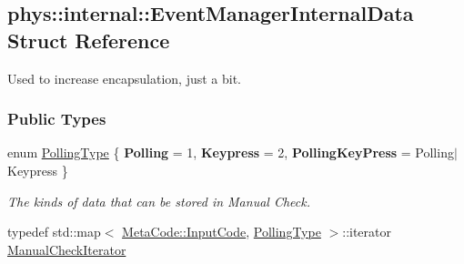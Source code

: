 \hypertarget{structphys_1_1internal_1_1EventManagerInternalData}{
\subsection{phys::internal::EventManagerInternalData Struct Reference}
\label{d6/d3a/structphys_1_1internal_1_1EventManagerInternalData}
}


Used to increase encapsulation, just a bit.  


\subsubsection*{Public Types}
\begin{DoxyCompactItemize}
\item 
enum \hyperlink{structphys_1_1internal_1_1EventManagerInternalData_ab9ab8380b84448aacf46a63050e159af}{PollingType} \{ {\bfseries Polling} = 1, 
{\bfseries Keypress} = 2, 
{\bfseries PollingKeyPress} =  Polling$|$Keypress
 \}
\begin{DoxyCompactList}\small\item\em The kinds of data that can be stored in Manual Check. \item\end{DoxyCompactList}\item 
typedef std::map$<$ \hyperlink{classphys_1_1MetaCode_a3e501cbb5bf0f6f1fdb7211465bda8d8}{MetaCode::InputCode}, \hyperlink{structphys_1_1internal_1_1EventManagerInternalData_ab9ab8380b84448aacf46a63050e159af}{PollingType} $>$::iterator \hyperlink{structphys_1_1internal_1_1EventManagerInternalData_ad2b9c7924f32e299846f1d945cb82dc0}{ManualCheckIterator}
\end{DoxyCompactItemize}
